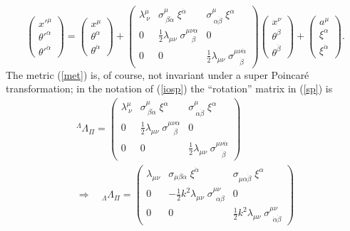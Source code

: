 \documentclass[a4paper,12pt]{article}
\newcommand{\al}{\ensuremath{\alpha}}
\newcommand{\be}{\ensuremath{\beta}}
\newcommand{\La}{\ensuremath{\Lambda}}
\newcommand{\la}{\ensuremath{\lambda}}
\newcommand{\si}{\ensuremath{\sigma}}
\newcommand{\te}{\ensuremath{\theta}}
\begin{document}
\begin{equation} \label{sp}
\left(\begin{array}{c} {x'}^\mu \\ {\te'}^\al \\ {\te'}^{\dot{\al}} \end{array}\right)
=\left(\begin{array}{c} x^\mu \\ \te^\al \\ \te^{\dot{\al}} \end{array}\right)+
\left(\begin{array}{ccc} \la^\mu_{\ \nu} & \si^\mu_{\ \be\dot{\al}}\;\xi^{\dot{\al}} & \si^\mu_{\ \al\dot{\be}}\;\xi^{\al} \\
0 & \frac{1}{2}\la_{\mu\nu}\;\si^{\mu\nu\al}_{\ \ \ \,\be} & 0 \\
0 & 0 & \frac{1}{2}\la_{\mu\nu}\;\si^{\mu\nu\dot{\al}}_{\ \ \ \,\dot{\be}} \end{array}\right)
\left(\begin{array}{c} x^\nu \\ \te^\be \\ \te^{\dot{\be}} \end{array}\right) +
\left(\begin{array}{c} a^\mu \\ \xi^\al \\ \xi^{\dot{\al}} \end{array}\right).
\end{equation}
The metric (\ref{met}) is, of course, not invariant under a super Poincar\'{e} transformation; in the notation of (\ref{iosp}) the ``rotation'' matrix in (\ref{sp}) is
\begin{gather} 
^\La\!\La_\Pi =\left(\begin{array}{ccc} \la^\mu_{\ \nu} & \si^\mu_{\ \be\dot{\al}}\;\xi^{\dot{\al}} & \si^\mu_{\ \al\dot{\be}}\;\xi^{\al} \\
0 & \frac{1}{2}\la_{\mu\nu}\;\si^{\mu\nu\al}_{\ \ \ \,\be} & 0 \\
0 & 0 & \frac{1}{2}\la_{\mu\nu}\;\si^{\mu\nu\dot{\al}}_{\ \ \ \,\dot{\be}} \end{array}\right) \\[8pt]
 \Rightarrow\quad _\La\La_\Pi=\left(\begin{array}{ccc} \la_{\mu\nu} & \si_{\mu\be\dot{\al}}\;\xi^{\dot{\al}} & \si_{\mu\al\dot{\be}}\;\xi^{\al} \\
0 & -\frac{1}{2}k^2\la_{\mu\nu}\;\si^{\mu\nu}_{\ \ \al\be} & 0 \\
0 & 0 & \frac{1}{2}k^2\la_{\mu\nu}\;\si^{\mu\nu}_{\ \ \dot{\al}\dot{\be}} \end{array}\right) \label{rotsp}
\end{gather}
\end{document}
